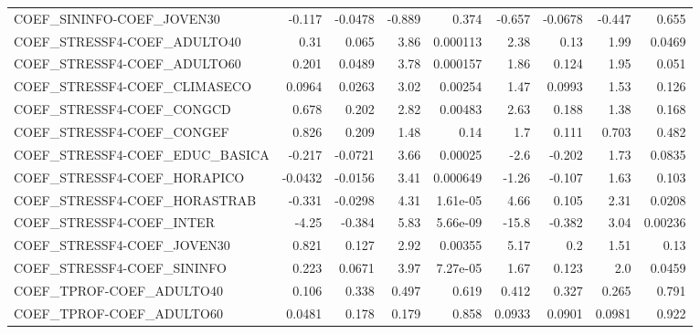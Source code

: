 \begin{tabular}{lrrrrrrrr}
COEF\_SININFO-COEF\_JOVEN30             &      -0.117 &      -0.0478 &  -0.889 &    0.374 &     -0.657 &     -0.0678 &       -0.447 &         0.655 \\
COEF\_STRESSF4-COEF\_ADULTO40           &        0.31 &        0.065 &    3.86 & 0.000113 &       2.38 &        0.13 &         1.99 &        0.0469 \\
COEF\_STRESSF4-COEF\_ADULTO60           &       0.201 &       0.0489 &    3.78 & 0.000157 &       1.86 &       0.124 &         1.95 &         0.051 \\
COEF\_STRESSF4-COEF\_CLIMASECO          &      0.0964 &       0.0263 &    3.02 &  0.00254 &       1.47 &      0.0993 &         1.53 &         0.126 \\
COEF\_STRESSF4-COEF\_CONGCD             &       0.678 &        0.202 &    2.82 &  0.00483 &       2.63 &       0.188 &         1.38 &         0.168 \\
COEF\_STRESSF4-COEF\_CONGEF             &       0.826 &        0.209 &    1.48 &     0.14 &        1.7 &       0.111 &        0.703 &         0.482 \\
COEF\_STRESSF4-COEF\_EDUC\_BASICA        &      -0.217 &      -0.0721 &    3.66 &  0.00025 &       -2.6 &      -0.202 &         1.73 &        0.0835 \\
COEF\_STRESSF4-COEF\_HORAPICO           &     -0.0432 &      -0.0156 &    3.41 & 0.000649 &      -1.26 &      -0.107 &         1.63 &         0.103 \\
COEF\_STRESSF4-COEF\_HORASTRAB          &      -0.331 &      -0.0298 &    4.31 & 1.61e-05 &       4.66 &       0.105 &         2.31 &        0.0208 \\
COEF\_STRESSF4-COEF\_INTER              &       -4.25 &       -0.384 &    5.83 & 5.66e-09 &      -15.8 &      -0.382 &         3.04 &       0.00236 \\
COEF\_STRESSF4-COEF\_JOVEN30            &       0.821 &        0.127 &    2.92 &  0.00355 &       5.17 &         0.2 &         1.51 &          0.13 \\
COEF\_STRESSF4-COEF\_SININFO            &       0.223 &       0.0671 &    3.97 & 7.27e-05 &       1.67 &       0.123 &          2.0 &        0.0459 \\
COEF\_TPROF-COEF\_ADULTO40              &       0.106 &        0.338 &   0.497 &    0.619 &      0.412 &       0.327 &        0.265 &         0.791 \\
COEF\_TPROF-COEF\_ADULTO60              &      0.0481 &        0.178 &   0.179 &    0.858 &     0.0933 &      0.0901 &       0.0981 &         0.922 \\

\end{tabular}

